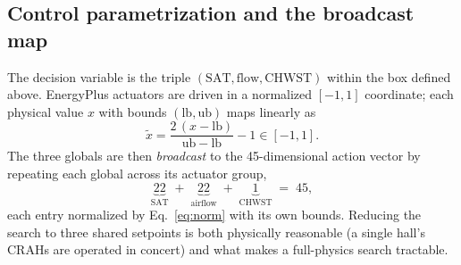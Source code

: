 \documentclass[11pt]{article}
\begin{document}
\subsection{Control parametrization and the broadcast map}
\label{sec:broadcast}
The decision variable is the triple \((\mathrm{SAT},\mathrm{flow},\mathrm{CHWST})\) within
the box defined above. EnergyPlus actuators are driven in a normalized
\([-1,1]\) coordinate; each physical value \(x\) with bounds \((\mathrm{lb},\mathrm{ub})\)
maps linearly as
\begin{equation}
\tilde{x} = \frac{2\,(x-\mathrm{lb})}{\mathrm{ub}-\mathrm{lb}} - 1 \in [-1,1].
\label{eq:norm}
\end{equation}
The three globals are then \emph{broadcast} to the 45-dimensional action vector by
repeating each global across its actuator group,
\begin{equation}
\underbrace{22}_{\text{SAT}} \;+\; \underbrace{22}_{\text{airflow}} \;+\; \underbrace{1}_{\text{CHWST}} \;=\; 45,
\label{eq:broadcast}
\end{equation}
each entry normalized by Eq.~\eqref{eq:norm} with its own bounds. Reducing the search to
three shared setpoints is both physically reasonable (a single hall's CRAHs are operated
in concert) and what makes a full-physics search tractable.
\end{document}

